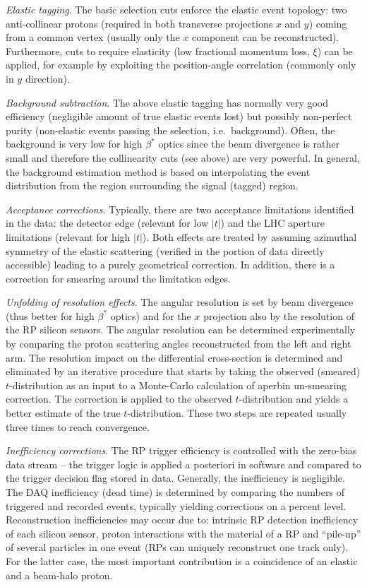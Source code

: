 \documentclass{desyproc}
\begin{document}
{\em Elastic tagging}. The basic selection cuts enforce the elastic event topology: two anti-collinear protons (required in both transverse projections $x$ and $y$) coming from a common vertex (usually only the $x$ component can be reconstructed). Furthermore, cuts to require elasticity (low fractional momentum loss, $\xi$) can be applied, for example by exploiting the position-angle correlation (commonly only in $y$ direction).

{\em Background subtraction}. The above elastic tagging has normally very good efficiency (negligible amount of true elastic events lost) but possibly non-perfect purity (non-elastic events passing the selection, i.e.~background). Often, the background is very low for high $\beta^*$ optics since the beam divergence is rather small and therefore the collinearity cuts (see above) are very powerful. In general, the background estimation method is based on interpolating the event distribution from the region surrounding the signal (tagged) region.

{\em Acceptance corrections}. Typically, there are two acceptance limitations identified in the data: the detector edge (relevant for low $|t|$) and the LHC aperture limitations (relevant for high $|t|$). Both effects are treated by assuming azimuthal symmetry of the elastic scattering (verified in the portion of data directly accessible) leading to a purely geometrical correction. In addition, there is a correction for smearing around the limitation edges.

{\em Unfolding of resolution effects}. The angular resolution is set by beam divergence (thus better for high $\beta^*$ optics) and for the $x$ projection also by the resolution of the RP silicon sensors. The angular resolution can be determined experimentally by comparing the proton scattering angles reconstructed from the left and right arm. The resolution impact on the differential cross-section is determined and eliminated by an iterative procedure that starts by taking the observed (smeared) $t$-distribution as an input to a Monte-Carlo calculation of a\break per\discretionary{-}{-}{-}bin un-smearing correction. The correction is applied to the observed $t$-distribution and yields a better estimate of the true $t$-distribution. These two steps are repeated usually three times to reach convergence.

\eject

{\em Inefficiency corrections}. The RP trigger efficiency is controlled with the zero-bias data stream -- the trigger logic is applied a posteriori in software and compared to the trigger decision flag stored in data. Generally, the inefficiency is negligible. The DAQ inefficiency (dead time) is determined by comparing the numbers of triggered and recorded events, typically yielding corrections on a percent level. Reconstruction inefficiencies may occur due to: intrinsic RP detection inefficiency of each silicon sensor, proton interactions with the material of a RP and ``pile-up'' of several particles in one event (RPs can uniquely reconstruct one track only). For the latter case, the most important contribution is a coincidence of an elastic and a beam-halo proton.
\end{document}
